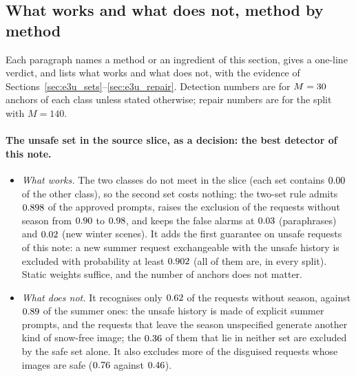 \documentclass{article}
\theoremstyle{plain}
\theoremstyle{remark}
\begin{document}
\subsection{What works and what does not, method by method}\label{sec:e3u_verdict}

Each paragraph names a method or an ingredient of this section, gives a one-line verdict, and lists what works and what does not, with the
evidence of Sections~\ref{sec:e3u_sets}--\ref{sec:e3u_repair}. Detection numbers are for $M=30$ anchors of each class unless stated
otherwise; repair numbers are for the split with $M=140$.

\paragraph{The unsafe set in the source slice, as a decision: the best detector of this note.}
\begin{itemize}
\item \emph{What works.} The two classes do not meet in the slice (each set contains $0.00$ of the other class), so the second
set costs nothing: the two-set rule admits $0.898$ of the approved prompts, raises the exclusion of the requests without season
from $0.90$ to $0.98$, and keeps the false alarms at $0.03$ (paraphrases) and $0.02$ (new winter
scenes). It adds the first guarantee on unsafe requests of this note: a new summer request exchangeable with the unsafe history is
excluded with probability at least $0.902$ (all of them are, in every split). Static weights suffice, and the number of anchors does not
matter.
\item \emph{What does not.} It recognises only $0.62$ of the requests without season, against $0.89$ of the summer ones:
the unsafe history is made of explicit summer prompts, and the requests that leave the season unspecified generate another kind of
snow-free image; the $0.36$ of them that lie in neither set are excluded by the safe set alone. It also excludes more of the disguised requests whose images are
safe ($0.76$ against $0.46$).
\end{itemize}
\end{document}
